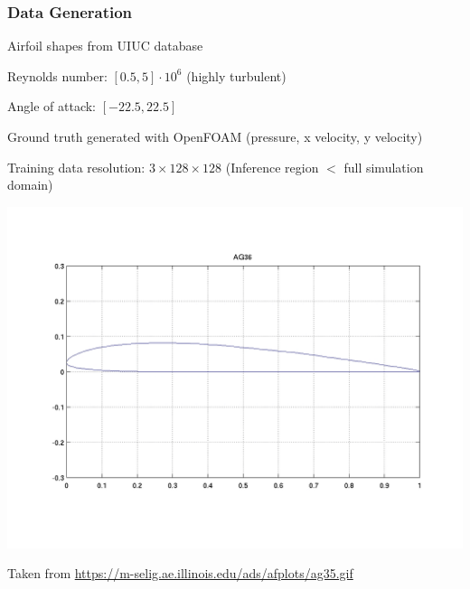 
\begin{frame}
    \frametitle{Data Generation}

\vspace*{1cm}
\begin{multicols}{2}
	\begin{PraesentationAufzaehlung}
	
	\item Airfoil shapes from UIUC database

    \item Reynolds number: $[0.5, 5] \cdot 10^6$ (highly turbulent)

    \item Angle of attack: $[-22.5, 22.5]$

    \item Ground truth generated with OpenFOAM \newline (pressure, x velocity, y velocity)
    
    \item Training data resolution: $3\times 128 \times 128$ \newline (Inference region $<$ full simulation domain)
    \end{PraesentationAufzaehlung}
    \vfill\columnbreak
    \includegraphics[width=\columnwidth, height=.6\textheight]{./Ressourcen/Praesentation/Bilder/uiuc_sample.png}
    
\end{multicols}
	\vspace*{-1.4cm}
    Taken from \url{https://m-selig.ae.illinois.edu/ads/afplots/ag35.gif}
\end{frame}
\clearpage